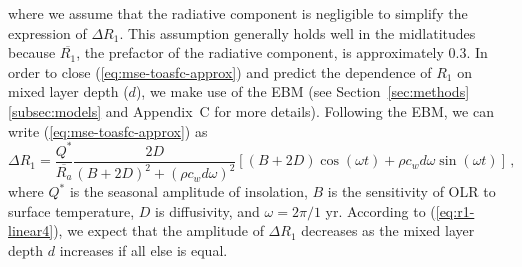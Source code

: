 \documentclass{ametsocV5}
\begin{document}
  where we assume that the radiative component is negligible to simplify the expression of $\Delta R_1$. This assumption generally holds well in the midlatitudes because $\overline{R_1}$, the prefactor of the radiative component, is approximately 0.3. In order to close (\ref{eq:mse-toasfc-approx}) and predict the dependence of $R_1$ on mixed layer depth ($d$), we make use of the EBM (see Section~\ref{sec:methods}\ref{subsec:models} and Appendix~C for more details). Following the EBM, we can write (\ref{eq:mse-toasfc-approx}) as
  \begin{equation} \label{eq:r1-linear4}
    \Delta R_{1} = \frac{Q^{*}}{\overline{R_{a}}}\frac{2D}{(B+2D)^{2}+(\rho c_w d \omega)^{2}}\left[(B+2D)\cos(\omega t)+\rho c_w d \omega \sin(\omega t)\right] \, ,
  \end{equation}
  where $Q^*$ is the seasonal amplitude of insolation, $B$ is the sensitivity of OLR to surface temperature, $D$ is diffusivity, and $\omega=2\pi/1$ yr. According to (\ref{eq:r1-linear4}), we expect that the amplitude of $\Delta R_1$ decreases as the mixed layer depth $d$ increases if all else is equal. 
  
    
\end{document}
